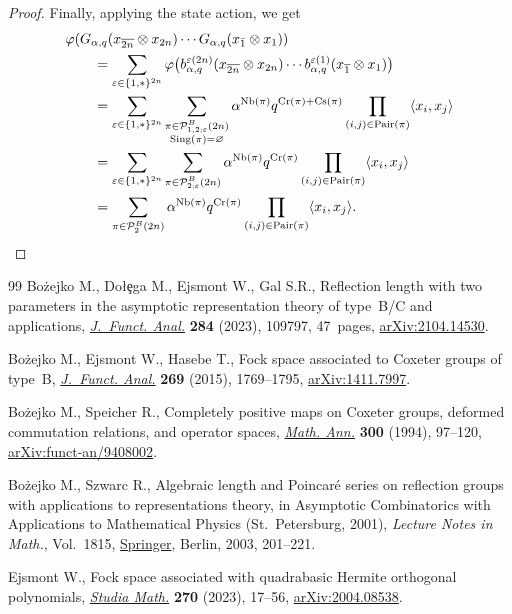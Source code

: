 \documentclass[11pt]{article}
\numberwithin{equation}{section}
\numberwithin{equation}{section}
\def\B{b_{\s,\q}}
\def\G{G_{\s,\q}}
\def\state {\varphi}
\def\PB{\mathcal{P}^{B}}
\def\Cr{\text{\normalfont Cr}}
\def\InS{\text{\normalfont Cs}}
\def\NB{\text{\normalfont Nb}}
\def\Pair{\text{\normalfont Pair}}
\def\Sing{\text{\normalfont Sing}}
\renewcommand{\epsilon}{\varepsilon}
\newcommand{\e}{{\epsilon}}
\newcommand{\q}{q}
\newcommand{\s}{\alpha}%
\begin{document}
\begin{proof}
 Finally, applying the state action, we get
\begin{align*}
&\state(\G(x_{\overline{ 2n}}\otimes x_{ 2n})\cdots \G(x_{\bar 1}\otimes x_{ 1}))
\\
&\qquad =\sum_{\e\in\{1,\ast\}^{2n}} \state\big( \B^{\epsilon(2n)}(x_{\overline{2n}}\otimes x_{2n})\cdots \B^{\epsilon(1)}(x_{\overline{1}}\otimes x_1)\big)
\\
&\qquad =\sum_{\e\in\{1,\ast\}^{2n}} \sum_{\substack{\pi\in\PB_{1,2;\epsilon}(2n)\\ \Sing(\pi)=\varnothing }} \s^{\NB(\pi)}q^{\Cr(\pi)+ \InS(\pi)}
\prod_{\substack{(i,j) \in \Pair(\pi)} }\langle x_i, x_j\rangle
\\
&\qquad =\sum_{\e\in\{1,\ast\}^{2n}} \sum_{\substack{\pi\in\PB_{2;\epsilon}(2n) }} \s^{\NB(\pi)}q^{\Cr(\pi)}
\prod_{\substack{(i,j) \in \Pair(\pi)} }\langle x_i, x_j\rangle
\\
&\qquad = \sum_{\pi\in\PB_{2}(2n)} \s^{\NB(\pi)}\q^{\Cr(\pi)} \prod_{\substack{(i,j) \in \Pair(\pi)} }\langle x_i, x_j\rangle.
\tag*{\qed}
\end{align*}
\renewcommand{\qed}{}
\end{proof}
\begin{thebibliography}{99}
Bo\.zejko M., Do{\l}\c{e}ga M., Ejsmont W., Gal S.R., Reflection length with
 two parameters in the asymptotic representation theory of type~{B}/{C} and
 applications, \href{https://doi.org/10.1016/j.jfa.2022.109797}{\textit{J.~Funct. Anal.}} \textbf{284} (2023), 109797, 47~pages,
 \href{https://arxiv.org/abs/2104.14530}{arXiv:2104.14530}.

Bo\.zejko M., Ejsmont W., Hasebe T., Fock space associated to {C}oxeter groups
 of type~{B}, \href{https://doi.org/10.1016/j.jfa.2015.06.026}{\textit{J.~Funct. Anal.}} \textbf{269} (2015), 1769--1795,
 \href{https://arxiv.org/abs/1411.7997}{arXiv:1411.7997}.

Bo\.zejko M., Speicher R., Completely positive maps on {C}oxeter groups,
 deformed commutation relations, and operator spaces, \href{https://doi.org/10.1007/BF01450478}{\textit{Math. Ann.}}
 \textbf{300} (1994), 97--120, \href{https://arxiv.org/abs/funct-an/9408002}{arXiv:funct-an/9408002}.

Bo\.zejko M., Szwarc R., Algebraic length and {P}oincar\'e series on reflection
 groups with applications to representations theory, in Asymptotic
 Combinatorics with Applications to Mathematical Physics ({S}t.~{P}etersburg,
 2001), \textit{Lecture Notes in Math.}, Vol.~1815, \href{https://doi.org/10.1007/3-540-44890-X_9}{Springer}, Berlin, 2003,
 201--221.

Ejsmont W., Fock space associated with quadrabasic {H}ermite orthogonal
 polynomials, \href{https://doi.org/10.4064/sm210916-19-8}{\textit{Studia Math.}} \textbf{270} (2023), 17--56,
 \href{https://arxiv.org/abs/2004.08538}{arXiv:2004.08538}.

\end{thebibliography}
\end{document}
